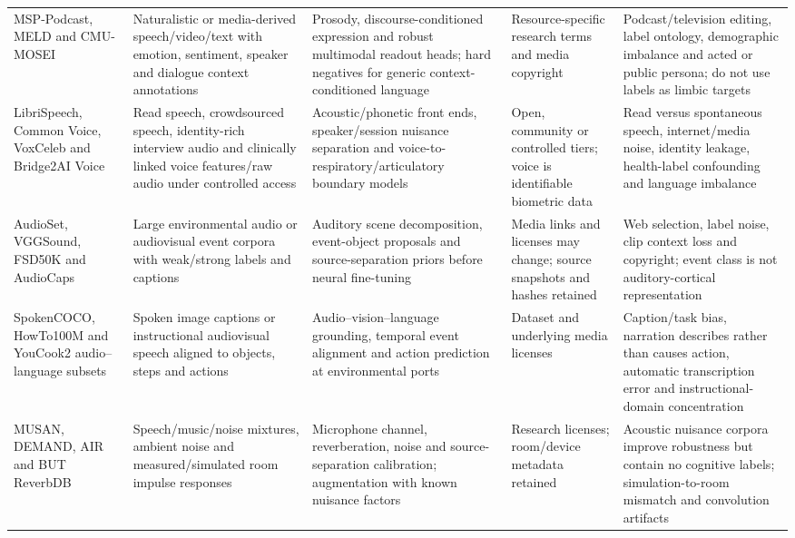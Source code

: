 \begin{table}[!h]
\begin{tabularx}{\textwidth}{@{}p{}p{}p{}p{}X@{}}
MSP-Podcast, MELD and CMU-MOSEI &
Naturalistic or media-derived speech/video/text with emotion, sentiment,
speaker and dialogue context annotations &
Prosody, discourse-conditioned expression and robust multimodal readout heads;
hard negatives for generic context-conditioned language &
Resource-specific research terms and media copyright &
Podcast/television editing, label ontology, demographic imbalance and acted
or public persona; do not use labels as limbic targets\\

LibriSpeech, Common Voice, VoxCeleb and Bridge2AI Voice &
Read speech, crowdsourced speech, identity-rich interview audio and
clinically linked voice features/raw audio under controlled access &
Acoustic/phonetic front ends, speaker/session nuisance separation and
voice-to-respiratory/articulatory boundary models &
Open, community or controlled tiers; voice is identifiable biometric data &
Read versus spontaneous speech, internet/media noise, identity leakage,
health-label confounding and language imbalance\\

AudioSet, VGGSound, FSD50K and AudioCaps &
Large environmental audio or audiovisual event corpora with weak/strong
labels and captions &
Auditory scene decomposition, event-object proposals and source-separation
priors before neural fine-tuning &
Media links and licenses may change; source snapshots and hashes retained &
Web selection, label noise, clip context loss and copyright; event class is
not auditory-cortical representation\\

SpokenCOCO, HowTo100M and YouCook2 audio--language subsets &
Spoken image captions or instructional audiovisual speech aligned to objects,
steps and actions &
Audio--vision--language grounding, temporal event alignment and action
prediction at environmental ports &
Dataset and underlying media licenses &
Caption/task bias, narration describes rather than causes action, automatic
transcription error and instructional-domain concentration\\

MUSAN, DEMAND, AIR and BUT ReverbDB &
Speech/music/noise mixtures, ambient noise and measured/simulated room impulse
responses &
Microphone channel, reverberation, noise and source-separation calibration;
augmentation with known nuisance factors &
Research licenses; room/device metadata retained &
Acoustic nuisance corpora improve robustness but contain no cognitive labels;
simulation-to-room mismatch and convolution artifacts\\


\end{tabularx}
\end{table}
